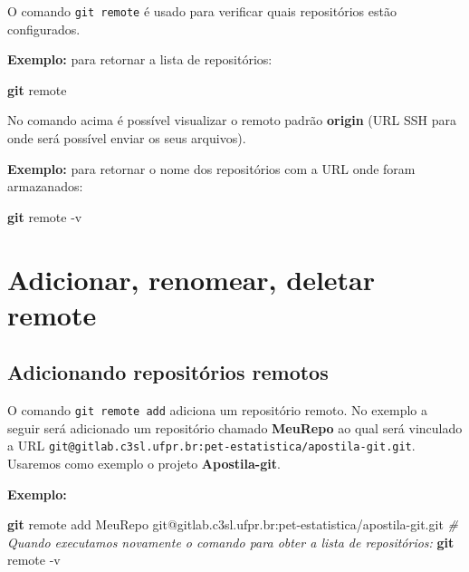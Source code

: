 \documentclass[
  a5paper,
  pagesize,
  9pt,
  pointlessnumbers,
  normalheadings,
  twoside=false
]{book}
\newenvironment{Shaded}{\begin{snugshade}}{\end{snugshade}}
\newcommand{\KeywordTok}[1]{\textcolor[rgb]{0.13,0.29,0.53}{\textbf{{#1}}}}
\newcommand{\CommentTok}[1]{\textcolor[rgb]{0.56,0.35,0.01}{\textit{{#1}}}}
\newcommand{\NormalTok}[1]{{#1}}
\begin{document}
O comando \texttt{git remote} é usado para verificar quais repositórios
estão configurados.

\textbf{Exemplo:} para retornar a lista de repositórios:

\begin{Shaded}
\begin{Highlighting}[]
\KeywordTok{git} \NormalTok{remote}
\end{Highlighting}
\end{Shaded}

No comando acima é possível visualizar o remoto padrão \textbf{origin}
(URL SSH para onde será possível enviar os seus arquivos).

\textbf{Exemplo:} para retornar o nome dos repositórios com a URL onde
foram armazanados:

\begin{Shaded}
\begin{Highlighting}[]
\KeywordTok{git} \NormalTok{remote -v}
\end{Highlighting}
\end{Shaded}

\section{Adicionar, renomear, deletar
remote}\label{adicionar-renomear-deletar-remote}

\subsection{Adicionando repositórios
remotos}\label{adicionando-repositorios-remotos}

O comando \texttt{git remote add} adiciona um repositório remoto. No
exemplo a seguir será adicionado um repositório chamado \textbf{MeuRepo}
ao qual será vinculado a URL
\texttt{git@gitlab.c3sl.ufpr.br:pet-estatistica/apostila-git.git}.
Usaremos como exemplo o projeto \textbf{Apostila-git}.

\textbf{Exemplo:}

\begin{Shaded}
\begin{Highlighting}[]
\KeywordTok{git} \NormalTok{remote add MeuRepo git@gitlab.c3sl.ufpr.br:pet-estatistica/apostila-git.git}
\CommentTok{# Quando executamos novamente o comando para obter a lista de repositórios:}
\KeywordTok{git} \NormalTok{remote -v}
\end{Highlighting}
\end{Shaded}
\end{document}
